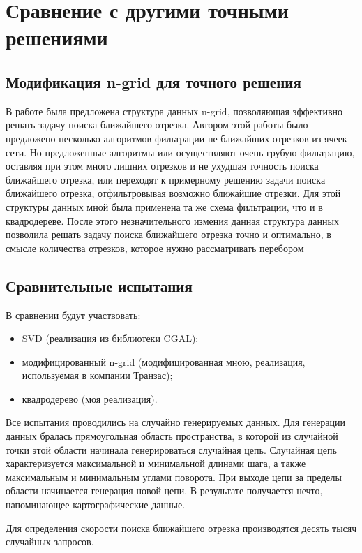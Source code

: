 \chapter{Сравнение с другими точными решениями}
\section{Модификация n-grid для точного решения}

В работе \cite{NGRID} была предложена структура данных n-grid, позволяющая
эффективно решать задачу поиска ближайшего отрезка. Автором этой работы
было предложено несколько алгоритмов фильтрации не ближайших отрезков из
ячеек сети. Но предложенные алгоритмы или осуществляют очень грубую
фильтрацию, оставляя при этом много лишних отрезков и не ухудшая точность
поиска ближайшего отрезка, или переходят к примерному решению задачи
поиска ближайшего отрезка, отфильтровывая возможно ближайшие отрезки.
Для этой структуры данных мной была применена та же схема
фильтрации, что и в квадродереве. После этого незначительного измения
данная структура данных позволила решать задачу поиска ближайшего отрезка
точно и оптимально, в смысле количества отрезков, которое нужно
рассматривать перебором

\section{Сравнительные испытания}

В сравнении будут участвовать:
\begin{itemize}
\item SVD (реализация из библиотеки CGAL);
\item модифицированный n-grid (модифицированная мною, реализация, используемая в компании
Транзас);
\item квадродерево (моя реализация).
\end{itemize}
Все испытания проводились на случайно генерируемых данных. Для
генерации данных бралась прямоугольная область пространства, в которой из
случайной точки этой области начинала генерироваться случайная цепь.
Случайная цепь характеризуется максимальной и минимальной длинами шага,
а также максимальным и минимальным углами поворота. При выходе цепи за
пределы области начинается генерация новой цепи. В результате получается
нечто, напоминающее картографические данные.

Для определения скорости поиска ближайшего отрезка производятся десять
тысяч случайных запросов.

